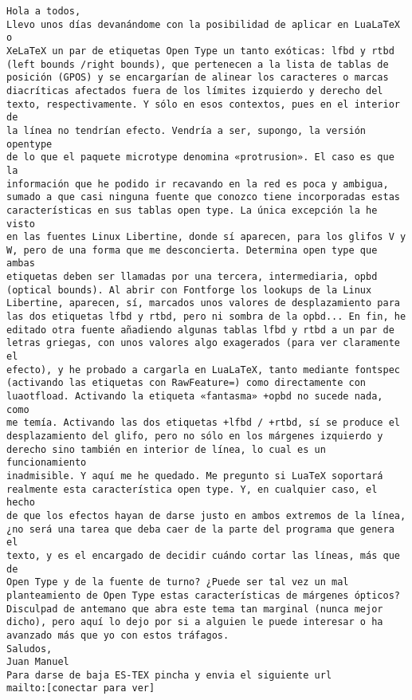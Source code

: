 \documentclass[a4paper,10pt]{article}
\begin{document}
\begin{lstlisting}
Hola a todos,
Llevo unos días devanándome con la posibilidad de aplicar en LuaLaTeX o 
XeLaTeX un par de etiquetas Open Type un tanto exóticas: lfbd y rtbd 
(left bounds /right bounds), que pertenecen a la lista de tablas de 
posición (GPOS) y se encargarían de alinear los caracteres o marcas 
diacríticas afectados fuera de los límites izquierdo y derecho del 
texto, respectivamente. Y sólo en esos contextos, pues en el interior de 
la línea no tendrían efecto. Vendría a ser, supongo, la versión opentype 
de lo que el paquete microtype denomina «protrusion». El caso es que la 
información que he podido ir recavando en la red es poca y ambigua, 
sumado a que casi ninguna fuente que conozco tiene incorporadas estas 
características en sus tablas open type. La única excepción la he visto 
en las fuentes Linux Libertine, donde sí aparecen, para los glifos V y 
W, pero de una forma que me desconcierta. Determina open type que ambas 
etiquetas deben ser llamadas por una tercera, intermediaria, opbd 
(optical bounds). Al abrir con Fontforge los lookups de la Linux 
Libertine, aparecen, sí, marcados unos valores de desplazamiento para 
las dos etiquetas lfbd y rtbd, pero ni sombra de la opbd... En fin, he 
editado otra fuente añadiendo algunas tablas lfbd y rtbd a un par de 
letras griegas, con unos valores algo exagerados (para ver claramente el 
efecto), y he probado a cargarla en LuaLaTeX, tanto mediante fontspec 
(activando las etiquetas con RawFeature=) como directamente con 
luaotfload. Activando la etiqueta «fantasma» +opbd no sucede nada, como 
me temía. Activando las dos etiquetas +lfbd / +rtbd, sí se produce el 
desplazamiento del glifo, pero no sólo en los márgenes izquierdo y 
derecho sino también en interior de línea, lo cual es un funcionamiento 
inadmisible. Y aquí me he quedado. Me pregunto si LuaTeX soportará 
realmente esta característica open type. Y, en cualquier caso, el hecho 
de que los efectos hayan de darse justo en ambos extremos de la línea, 
¿no será una tarea que deba caer de la parte del programa que genera el 
texto, y es el encargado de decidir cuándo cortar las líneas, más que de 
Open Type y de la fuente de turno? ¿Puede ser tal vez un mal 
planteamiento de Open Type estas características de márgenes ópticos?
Disculpad de antemano que abra este tema tan marginal (nunca mejor 
dicho), pero aquí lo dejo por si a alguien le puede interesar o ha 
avanzado más que yo con estos tráfagos.
Saludos,
Juan Manuel
Para darse de baja ES-TEX pincha y envia el siguiente url
mailto:[conectar para ver]

\end{lstlisting}
\end{document}
